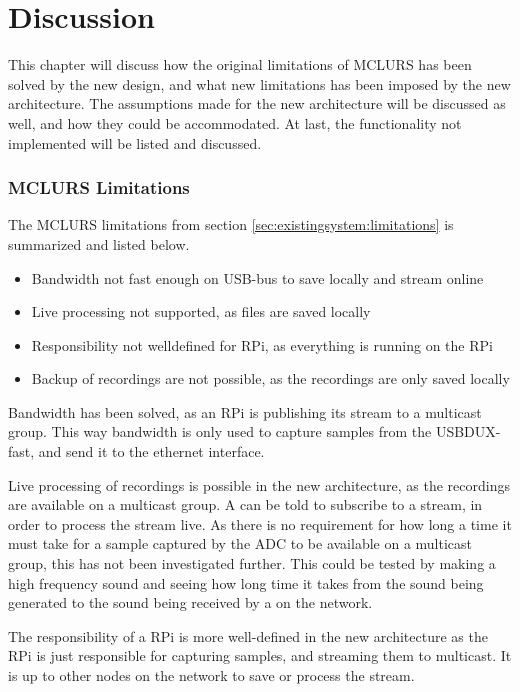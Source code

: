 \chapter{Discussion}\label{chp:discussion}
This chapter will discuss how the original limitations of MCLURS has been solved by the new design, and what new limitations has been imposed by the new architecture. The assumptions made for the new architecture will be discussed as well, and how they could be accommodated. At last, the functionality not implemented will be listed and discussed.

\subsection{MCLURS Limitations}

\noindent{}The MCLURS limitations from section \ref{sec:existingsystem:limitations} is summarized and listed below.
\begin{itemize}
	\item Bandwidth not fast enough on USB-bus to save locally and stream online
	\item Live processing not supported, as files are saved locally
	\item Responsibility not welldefined for RPi, as everything is running on the RPi
	\item Backup of recordings are not possible, as the recordings are only saved locally
\end{itemize} 

Bandwidth has been solved, as an RPi is publishing its stream to a multicast group. This way bandwidth is only used to capture samples from the USBDUX-fast, and send it to the ethernet interface.
 
Live processing of recordings is possible in the new architecture, as the recordings are available on a multicast group. A \sub{} can be told to subscribe to a stream, in order to process the stream live. As there is no requirement for how long a time it must take for a sample captured by the ADC to be available on a multicast group, this has not been investigated further. This could be tested by making a high frequency sound and seeing how long time it takes from the sound being generated to the sound being received by a  on the network.

The responsibility of a RPi is more well-defined in the new architecture as the RPi is just responsible for capturing samples, and streaming them to multicast. It is up to other nodes on the network to save or process the stream.

